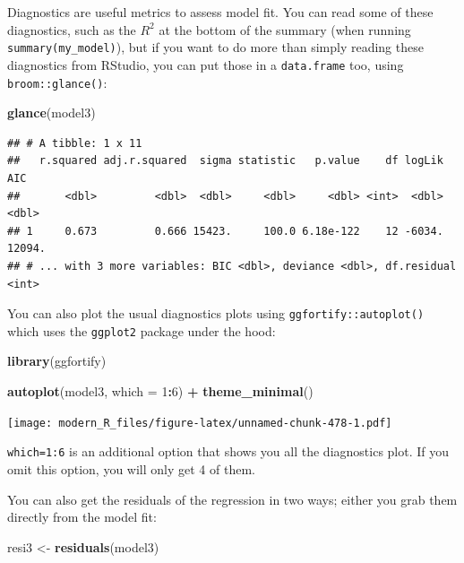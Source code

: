 \documentclass[]{gitbook}
\newenvironment{Shaded}{\begin{snugshade}}{\end{snugshade}}
\newcommand{\DataTypeTok}[1]{\textcolor[rgb]{0.13,0.29,0.53}{#1}}
\newcommand{\DecValTok}[1]{\textcolor[rgb]{0.00,0.00,0.81}{#1}}
\newcommand{\KeywordTok}[1]{\textcolor[rgb]{0.13,0.29,0.53}{\textbf{#1}}}
\newcommand{\NormalTok}[1]{#1}
\newcommand{\OperatorTok}[1]{\textcolor[rgb]{0.81,0.36,0.00}{\textbf{#1}}}
\newcommand{\StringTok}[1]{\textcolor[rgb]{0.31,0.60,0.02}{#1}}
\begin{document}
Diagnostics are useful metrics to assess model fit. You can read some of these diagnostics, such as
the \(R^2\) at the bottom of the summary (when running \texttt{summary(my\_model)}), but if you want to do
more than simply reading these diagnostics from RStudio, you can put those in a \texttt{data.frame} too,
using \texttt{broom::glance()}:

\begin{Shaded}
\begin{Highlighting}[]
\KeywordTok{glance}\NormalTok{(model3)}
\end{Highlighting}
\end{Shaded}

\begin{verbatim}
## # A tibble: 1 x 11
##   r.squared adj.r.squared  sigma statistic   p.value    df logLik    AIC
##       <dbl>         <dbl>  <dbl>     <dbl>     <dbl> <int>  <dbl>  <dbl>
## 1     0.673         0.666 15423.     100.0 6.18e-122    12 -6034. 12094.
## # ... with 3 more variables: BIC <dbl>, deviance <dbl>, df.residual <int>
\end{verbatim}

You can also plot the usual diagnostics plots using \texttt{ggfortify::autoplot()} which uses the
\texttt{ggplot2} package under the hood:

\begin{Shaded}
\begin{Highlighting}[]
\KeywordTok{library}\NormalTok{(ggfortify)}

\KeywordTok{autoplot}\NormalTok{(model3, }\DataTypeTok{which =} \DecValTok{1}\OperatorTok{:}\DecValTok{6}\NormalTok{) }\OperatorTok{+}\StringTok{ }\KeywordTok{theme_minimal}\NormalTok{()}
\end{Highlighting}
\end{Shaded}

\texttt{[image: modern\_R\_files/figure-latex/unnamed-chunk-478-1.pdf]}

\texttt{which=1:6} is an additional option that shows you all the diagnostics plot. If you omit this
option, you will only get 4 of them.

You can also get the residuals of the regression in two ways; either you grab them directly from
the model fit:

\begin{Shaded}
\begin{Highlighting}[]
\NormalTok{resi3 <-}\StringTok{ }\KeywordTok{residuals}\NormalTok{(model3)}
\end{Highlighting}
\end{Shaded}
\end{document}
